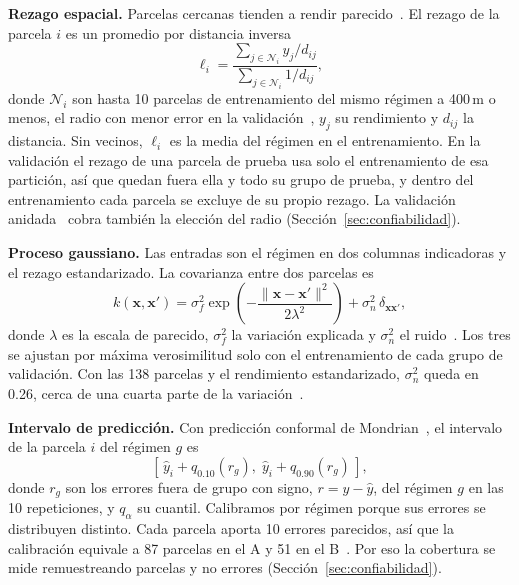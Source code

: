 \documentclass[conference,letterpaper]{IEEEtran}
\begin{document}
\textbf{Rezago espacial.} Parcelas cercanas tienden a rendir parecido~\cite{tobler1970}. El rezago de la parcela $i$ es un promedio por distancia
inversa~\cite{shepard1968}
\begin{equation}
\ell_i = \frac{\sum_{j\in\mathcal{N}_i} y_j / d_{ij}}{\sum_{j\in\mathcal{N}_i} 1 / d_{ij}},
\label{eq:rezago}
\end{equation}
donde $\mathcal{N}_i$ son hasta 10 parcelas de entrenamiento del mismo régimen a 400\,m o menos, el radio con menor
error en la validación~\cite{doc_modelo}, $y_j$ su rendimiento y
$d_{ij}$ la distancia. Sin vecinos, $\ell_i$ es la media del régimen en el entrenamiento. En la validación el rezago
de una parcela de prueba usa solo el entrenamiento de esa partición, así que quedan fuera ella y todo su grupo de
prueba, y dentro del entrenamiento cada parcela se excluye de su propio rezago. La validación
anidada~\cite{varma2006} cobra también la elección del radio (Sección~\ref{sec:confiabilidad}).



\textbf{Proceso gaussiano.} Las entradas son el régimen en dos columnas indicadoras y el rezago estandarizado. La
covarianza entre dos parcelas es
\begin{equation}
k(\mathbf{x},\mathbf{x}') = \sigma_f^2 \exp\!\left(-\frac{\lVert\mathbf{x}-\mathbf{x}'\rVert^2}{2\lambda^2}\right) +
\sigma_n^2\,\delta_{\mathbf{x}\mathbf{x}'},
\label{eq:kernel}
\end{equation}
donde $\lambda$ es la escala de parecido, $\sigma_f^2$ la variación explicada y $\sigma_n^2$ el ruido~\cite{rasmussen2006}.
Los tres se ajustan por máxima verosimilitud solo con el entrenamiento de cada grupo de validación. Con las 138
parcelas y el rendimiento estandarizado, $\sigma_n^2$ queda en 0.26, cerca de una cuarta parte de la
variación~\cite{doc_modelo}.

\textbf{Intervalo de predicción.} Con predicción conformal de Mondrian~\cite{vovk2005,lei2018}, el intervalo de la
parcela $i$ del régimen $g$ es
\begin{equation}
\left[\,\hat y_i + q_{0.10}(r_g),\; \hat y_i + q_{0.90}(r_g)\,\right],
\label{eq:intervalo}
\end{equation}
donde $r_g$ son los errores fuera de grupo con signo, $r = y - \hat y$, del régimen $g$ en las 10 repeticiones, y $q_\alpha$ su cuantil. Calibramos por régimen porque sus errores se distribuyen distinto.
Cada parcela aporta 10 errores parecidos, así que la calibración equivale a 87 parcelas en el A y 51 en el B~\cite{doc_modelo}. Por eso
la cobertura se mide remuestreando parcelas y no errores (Sección~\ref{sec:confiabilidad}).
\end{document}
